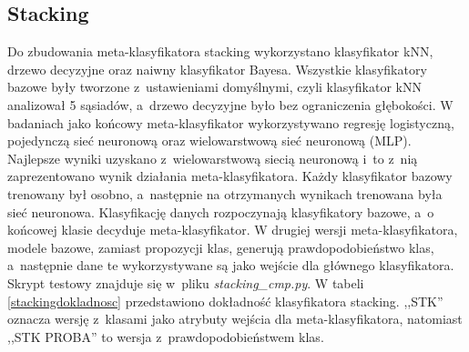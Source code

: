 \subsection{Stacking}
Do zbudowania meta-klasyfikatora stacking wykorzystano klasyfikator kNN, drzewo decyzyjne oraz naiwny klasyfikator Bayesa. Wszystkie klasyfikatory bazowe były tworzone z~ustawieniami domyślnymi, czyli klasyfikator kNN analizował 5 sąsiadów, a~drzewo decyzyjne było bez ograniczenia głębokości. W badaniach jako końcowy meta-klasyfikator wykorzystywano regresję logistyczną, pojedynczą sieć neuronową oraz wielowarstwową sieć neuronową (MLP). Najlepsze wyniki uzyskano z~wielowarstwową siecią neuronową i~to z~nią zaprezentowano wynik działania meta-klasyfikatora. Każdy klasyfikator bazowy trenowany był osobno, a~następnie na otrzymanych wynikach trenowana była sieć neuronowa. Klasyfikację danych rozpoczynają klasyfikatory bazowe, a~o końcowej klasie decyduje meta-klasyfikator. W drugiej wersji meta-klasyfikatora, modele bazowe, zamiast propozycji klas, generują prawdopodobieństwo klas, a~następnie dane te wykorzystywane są jako wejście dla głównego klasyfikatora. Skrypt testowy znajduje się w~pliku \textit{stacking\_cmp.py}. W tabeli \ref{stackingdokladnosc} przedstawiono dokładność klasyfikatora stacking. ,,STK'' oznacza wersję z~klasami jako atrybuty wejścia dla meta-klasyfikatora, natomiast ,,STK PROBA'' to wersja z~prawdopodobieństwem klas. 
